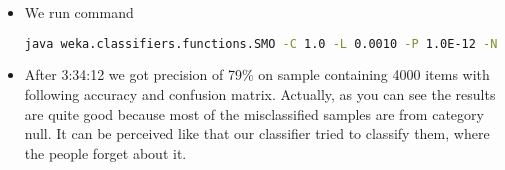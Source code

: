 \begin{itemize}
        \begin{itemize}
            \item We launch Weka
            \item Switched to Explorer
            \item Set up {\it Component} as label attribute for training and testing
            \item Choose 10 fold cross validation
            \item Choose Support Vector Machines (SMO)
            \item Copy parameters generated by GUI to command line
        \end{itemize}
    \item We run command
\begin{lstlisting}[language=sh]
    java weka.classifiers.functions.SMO -C 1.0 -L 0.0010 -P 1.0E-12 -N 0 -V -1 -W 1 -K "weka.classifiers.functions.supportVector.PolyKernel -C 250007 -E 1.0" -t sample-vectorised.arff -c 7> smo.out
\end{lstlisting}
    \item After 3:34:12 we got precision of 79\% on sample containing 4000 items with following accuracy and confusion matrix.
    Actually, as you can see the results are quite good because most of the misclassified samples are from category null.
    It can be perceived like that our classifier tried to classify them, where the people forget about it.


\end{itemize}
